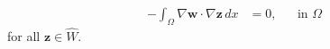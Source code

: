 \documentclass[a4paper,11pt,openright,twoside]{book}
\begin{document}
\begin{align}
-  \int_{\Omega} \nabla \mathbf{w} \cdot \nabla \mathbf{z} \, dx &= 0, && \text{in } \Omega
\end{align}
for all $ \mathbf{z} \in \hat{W}$.


%
%
%
%
%
\end{document}

